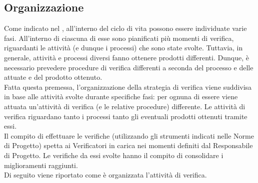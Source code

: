 \subsection{Organizzazione}
	Come indicato nel , all'interno del ciclo di vita possono essere individuate varie fasi. All'interno di ciascuna di 
	esse sono pianificati più momenti di verifica, riguardanti le attività (e dunque i processi) che sono state svolte. Tuttavia, in generale, attività 
	e processi diversi fanno ottenere prodotti differenti. Dunque, è necessario prevedere procedure di verifica differenti a seconda del processo e delle 
	attuate e del prodotto ottenuto.\\
	Fatta questa premessa, l'organizzazione della strategia di verifica viene suddivisa in base alle attività svolte durante specifiche fasi: per ognuna 
	di essere viene attuata un'attività di verifica (e le relative procedure) differente. Le attività di verifica riguardano tanto i processi tanto gli 
	eventuali prodotti ottenuti tramite essi.\\
	Il compito di effettuare le verifiche (utilizzando gli strumenti indicati nelle Norme di Progetto) spetta ai Verificatori in carica nei momenti 
	definiti dal Responsabile di Progetto. Le verifiche da essi svolte hanno il compito di consolidare i miglioramenti raggiunti.\\
	Di seguito viene riportato come è organizzata l'attività di verifica.
